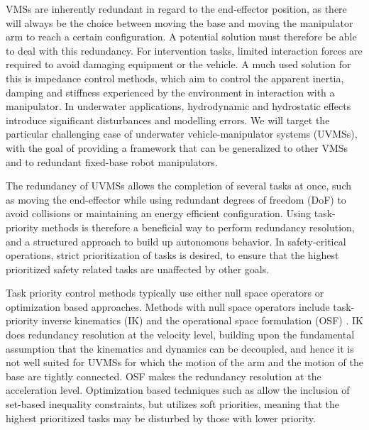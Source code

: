 \documentclass[../main.tex]{subfiles}
\begin{document}
VMSs are inherently redundant in regard to the end-effector position, as there will always be the choice between moving the base and moving the manipulator arm to reach a certain configuration. A potential solution must therefore be able to deal with this redundancy. For intervention tasks, limited interaction forces are required to avoid damaging equipment or the vehicle. A much used solution for this is impedance control methods, which aim to control the apparent inertia, damping and stiffness experienced by the environment in interaction with a manipulator. In underwater applications, hydrodynamic and hydrostatic effects introduce significant disturbances and modelling errors. We will target the particular challenging case of underwater vehicle-manipulator systems (UVMSs), with the goal of providing a framework that can be generalized to other VMSs and to redundant fixed-base robot manipulators.


The redundancy of UVMSs allows the completion of several tasks at once, such as moving the end-effector while using redundant degrees of freedom (DoF) to avoid collisions or maintaining an energy efficient configuration. Using task-priority methods is therefore a beneficial way to perform redundancy resolution, and a structured approach to build up autonomous behavior. In safety-critical operations, strict prioritization of tasks is desired, to ensure that the highest prioritized safety related tasks are unaffected by other goals.

Task priority control methods typically use either null space operators \cite{Dietrich2015} or optimization based approaches. Methods with null space operators include task-priority inverse kinematics (IK) \cite{Siciliano1991,Chiaverini1997} and the operational space formulation (OSF) \cite{Khatib1987}. IK does redundancy resolution at the velocity level, building upon the fundamental assumption that the kinematics and dynamics can be decoupled, and hence it is not well suited for UVMSs for which the motion of the arm and the motion of the base are tightly connected. OSF makes the redundancy resolution at the acceleration level. Optimization based techniques such as \cite{Kanoun2011, Bouyarmane2018} allow the inclusion of set-based inequality constraints, but utilizes soft priorities, meaning that the highest prioritized tasks may be disturbed by those with lower priority.
\end{document}
